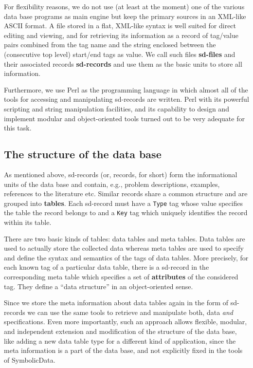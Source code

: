 \documentclass[11pt,a4paper]{article}
\newcommand{\SD}{{\sc Symbolic\-Data}}
\begin{document}
For flexibility reasons, we do not use (at least at the moment) one of
the various data base programs as main engine but keep the primary
sources in an XML-like ASCII format. A file stored in a flat, XML-like
syntax is well suited for direct editing and viewing, and for
retrieving its information as a record of tag/value pairs combined
from the tag name and the string enclosed between the (consecutive top
level) start/end tags as value.  We call such files {\bf sd-files} and
their associated records {\bf sd-records} and use them as the basic
units to store all information.

Furthermore, we use Perl as the programming language in which almost
all of the tools for accessing and manipulating sd-records are
written. Perl with its powerful scripting and string manipulation
facilities, and its capability to design and implement modular and
object-oriented tools turned out to be very adequate for this task.


\subsection{The structure of the data base}

As mentioned above, sd-records (or, records, for short) form the
informational units of the data base and contain, e.g., problem
descriptions, examples, references to the literature etc. Similar
records share a common structure and are grouped into {\bf tables}.
Each sd-record must have a {\tt Type} tag whose value specifies the
table the record belongs to and a {\tt Key} tag which uniquely
identifies the record within its table.

There are two basic kinds of tables: data tables and meta tables.
Data tables are used to actually store the collected data whereas meta
tables are used to specify and define the syntax and semantics of the
tags of data tables. More precisely, for each known tag of a
particular data table, there is a sd-record in the corresponding meta
table which specifies a set of {\bf attributes} of the considered tag.
They define a ``data structure'' in an object-oriented sense.

Since we store the meta information about data tables again in the
form of sd-records we can use the same tools to retrieve and
manipulate both, data {\em and} specifications.  Even more
importantly, such an approach allows flexible, modular, and
independent extension and modification of the structure of the data
base, like adding a new data table type for a different kind of
application, since the meta information is a part of the data base,
and not explicitly fixed in the tools of \SD.
\end{document}
